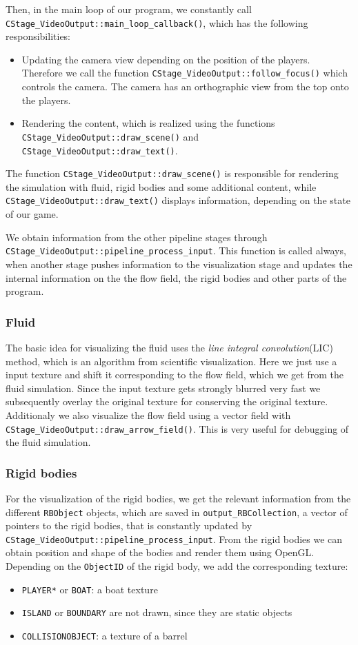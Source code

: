 Then, in the main loop of our program, we constantly call \texttt{CStage_VideoOutput::main_loop_callback()}, which has the following responsibilities:
\begin{itemize}
\item Updating the camera view depending on the position of the players. Therefore we call the function \texttt{CStage_VideoOutput::follow_focus()} which controls the camera. The camera has an orthographic view from the top onto the players.
\item Rendering the content, which is realized using the functions \texttt{CStage_VideoOutput::draw_scene()} and \texttt{CStage_VideoOutput::draw_text()}.
\end{itemize}
The function \texttt{CStage_VideoOutput::draw_scene()} is responsible for rendering the simulation with fluid, rigid bodies and some additional content, while \texttt{CStage_VideoOutput::draw_text()} displays information, depending on the state of our game.

We obtain information from the other pipeline stages through \texttt{CStage_VideoOutput::pipeline_process_input}. This function is called always, when another stage pushes information to the visualization stage and updates the internal information on the the flow field, the rigid bodies and other parts of the program.

\subsubsection{Fluid}
The basic idea for visualizing the fluid uses the \emph{line integral convolution}(LIC) method, which is an algorithm from scientific visualization. Here we just use a input texture and shift it corresponding to the flow field, which we get from the fluid simulation. Since the input texture gets strongly blurred very fast we subsequently overlay the original texture for conserving the original texture.
Additionaly we also visualize the flow field using a vector field with \texttt{CStage_VideoOutput::draw_arrow_field()}. This is very useful for debugging of the fluid simulation.

\subsubsection{Rigid bodies}
For the visualization of the rigid bodies, we get the relevant information from the different \texttt{RBObject} objects, which are saved in \texttt{output_RBCollection}, a vector of pointers to the rigid bodies, that is constantly updated by \texttt{CStage_VideoOutput::pipeline_process_input}. From the rigid bodies we can obtain position and shape of the bodies and render them using OpenGL. Depending on the \texttt{ObjectID} of the rigid body, we add the corresponding texture:
\begin{itemize}
\item \texttt{PLAYER*} or \texttt{BOAT}: a boat texture
\item \texttt{ISLAND} or \texttt{BOUNDARY} are not drawn, since they are static objects
\item \texttt{COLLISIONOBJECT}: a texture of a barrel
\end{itemize}

